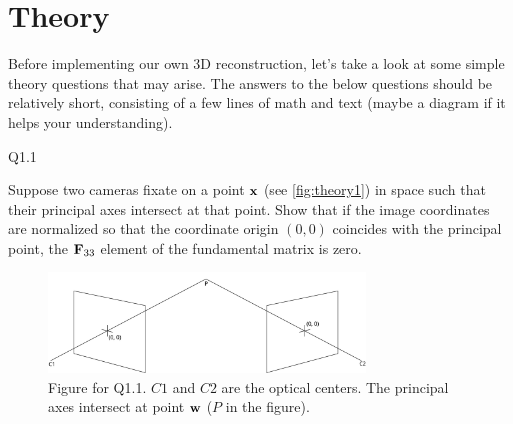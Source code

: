 \part{Theory}
\label{part:theory}
Before implementing our own 3D reconstruction, let's take a  look at some simple theory questions that may arise. The answers to the below questions should be relatively short, consisting of a few lines of math and text (maybe a diagram if it helps your understanding). 

\subparagraph*{Q1.1}
Suppose two cameras fixate on a point ${\bf x}$ (see \autoref{fig:theory1}) in space such that their principal axes intersect at that point. Show that if the image coordinates are normalized so that the coordinate origin $(0, 0)$ coincides with the principal point, the ${\bf F}_{33}$ element of the fundamental
matrix is zero.
\begin{figure}[h]
    \centering
    \includegraphics[width=0.75\textwidth]{images/drawing-1.pdf}
    \caption{Figure for Q1.1. $C1$ and $C2$ are the optical centers. The principal axes intersect at point ${\bf w}$ ($P$ in the figure).}
    \label{fig:theory1}
\end{figure}

